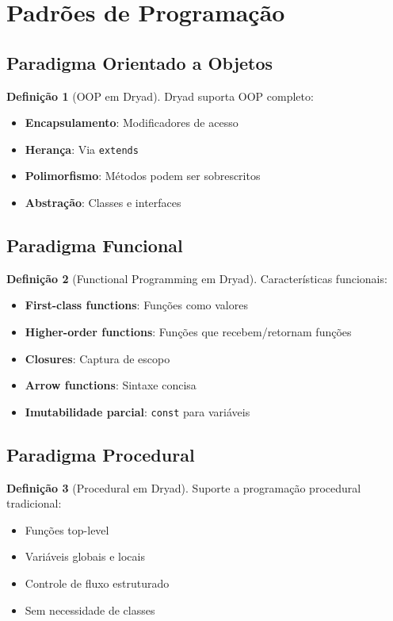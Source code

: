 \documentclass[12pt,a4paper]{article}
\theoremstyle{definition}
\newtheorem{definition}{Definição}[section]
\begin{document}
\section{Padrões de Programação}

\subsection{Paradigma Orientado a Objetos}

\begin{definition}[OOP em Dryad]
Dryad suporta OOP completo:
\begin{itemize}
    \item \textbf{Encapsulamento}: Modificadores de acesso
    \item \textbf{Herança}: Via \texttt{extends}
    \item \textbf{Polimorfismo}: Métodos podem ser sobrescritos
    \item \textbf{Abstração}: Classes e interfaces
\end{itemize}
\end{definition}

\subsection{Paradigma Funcional}

\begin{definition}[Functional Programming em Dryad]
Características funcionais:
\begin{itemize}
    \item \textbf{First-class functions}: Funções como valores
    \item \textbf{Higher-order functions}: Funções que recebem/retornam funções
    \item \textbf{Closures}: Captura de escopo
    \item \textbf{Arrow functions}: Sintaxe concisa
    \item \textbf{Imutabilidade parcial}: \texttt{const} para variáveis
\end{itemize}
\end{definition}

\subsection{Paradigma Procedural}

\begin{definition}[Procedural em Dryad]
Suporte a programação procedural tradicional:
\begin{itemize}
    \item Funções top-level
    \item Variáveis globais e locais
    \item Controle de fluxo estruturado
    \item Sem necessidade de classes
\end{itemize}
\end{definition}
\end{document}
